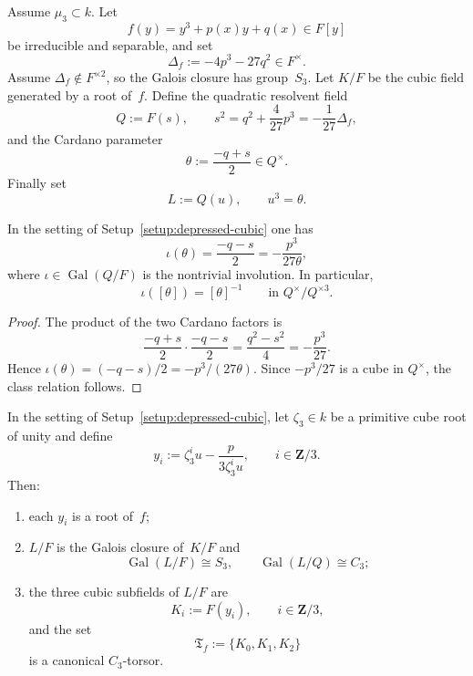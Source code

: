 \begin{setup}
\label{setup:depressed-cubic}
Assume $\mu_3\subset k$.  Let
\[
f(y)=y^3+p(x)y+q(x)\in F[y]
\]
be irreducible and separable, and set
\[
\Delta_f:=-4p^3-27q^2\in F^{\times}.
\]
Assume $\Delta_f\notin F^{\times 2}$, so the Galois closure has group~$S_3$.
Let $K/F$ be the cubic field generated by a root of~$f$.
Define the quadratic resolvent field
\[
Q:=F(s),\qquad s^2=q^2+\frac{4}{27}p^3=-\frac{1}{27}\Delta_f,
\]
and the Cardano parameter
\[
\theta:=\frac{-q+s}{2}\in Q^{\times}.
\]
Finally set
\[
L:=Q(u),\qquad u^3=\theta.
\]
\end{setup}

\begin{proposition}
\label{prop:cardano-identities}
In the setting of Setup~\ref{setup:depressed-cubic} one has
\[
\iota(\theta)=\frac{-q-s}{2}= -\frac{p^3}{27\theta},
\]
where $\iota\in\operatorname{Gal}(Q/F)$ is the nontrivial involution.  In particular,
\[
\iota([\theta])=[\theta]^{-1}
\qquad\text{in }Q^{\times}/Q^{\times 3}.
\]
\end{proposition}

\begin{proof}
The product of the two Cardano factors is
\[
\frac{-q+s}{2}\cdot\frac{-q-s}{2}=\frac{q^2-s^2}{4}
=-\frac{p^3}{27}.
\]
Hence $\iota(\theta)=(-q-s)/2=-p^3/(27\theta)$.  Since $-p^3/27$ is a cube in
$Q^{\times}$, the class relation follows.
\end{proof}

\begin{theorem}
\label{thm:cardano-tower-cubic-quotients}
In the setting of Setup~\ref{setup:depressed-cubic}, let $\zeta_3\in k$ be a
primitive cube root of unity and define
\[
y_i:=\zeta_3^i u-\frac{p}{3\zeta_3^i u},
\qquad i\in \mathbf Z/3.
\]
Then:
\begin{enumerate}[label=\textup{(\roman*)}]
\item each $y_i$ is a root of~$f$;
\item $L/F$ is the Galois closure of~$K/F$ and
\[
\operatorname{Gal}(L/F)\cong S_3,
\qquad
\operatorname{Gal}(L/Q)\cong C_3;
\]
\item the three cubic subfields of $L/F$ are
\[
K_i:=F(y_i),\qquad i\in \mathbf Z/3,
\]
and the set
\[
\mathfrak T_f:=\{K_0,K_1,K_2\}
\]
is a canonical $C_3$-torsor.
\end{enumerate}
\end{theorem}


